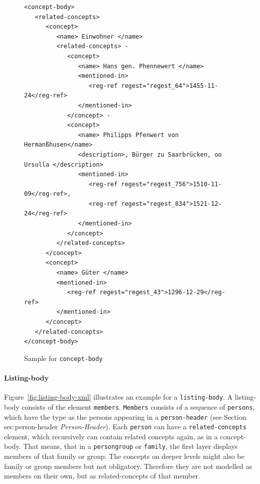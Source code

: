 \begin{figure}[H]
\centering
\begin{verbatim}
<concept-body>
   <related-concepts>
      <concept>
         <name> Einwohner </name>
         <related-concepts> -
            <concept>
               <name> Hans gen. Phennewert </name>
               <mentioned-in>
                  <reg-ref regest="regest_64">1455-11-24</reg-ref>
               </mentioned-in>
            </concept> -
            <concept>
               <name> Philipps Pfenwert von Hermanßhusen</name>
               <description>, Bürger zu Saarbrücken, oo Ursulla </description>
               <mentioned-in>
                  <reg-ref regest="regest_756">1510-11-09</reg-ref>, 
                  <reg-ref regest="regest_834">1521-12-24</reg-ref>
               </mentioned-in>
            </concept>
         </related-concepts>
      </concept>
      <concept>
         <name> Güter </name>
         <mentioned-in>
            <reg-ref regest="regest_43">1296-12-29</reg-ref>
         </mentioned-in>
      </concept>
   </related-concepts>
</concept-body>
\end{verbatim}
\caption{Sample for \texttt{concept-body}}
\label{fig:concept-body-xml}
\end{figure}

\paragraph{Listing-body}
Figure~\ref{fig:listing-body-xml} illustrates an example for a \texttt{listing-body}. A listing-body consists of the element \texttt{members}. \texttt{Members} consists of a sequence of \texttt{persons}, which have the type as the persons appearing in a \texttt{person-header} (see Section sec:person-header \textit{Person-Header}). Each \texttt{person} can have a \texttt{related-concepts} element, which recursively can contain related concepts again, as in a concept-body.
That means, that in a \texttt{persongroup} or \texttt{family}, the first layer displays members of that family or group. The concepts on deeper levels might also be family or group members but not obligatory. Therefore they are not modelled as members on their own, but as related-concepts of that member.

